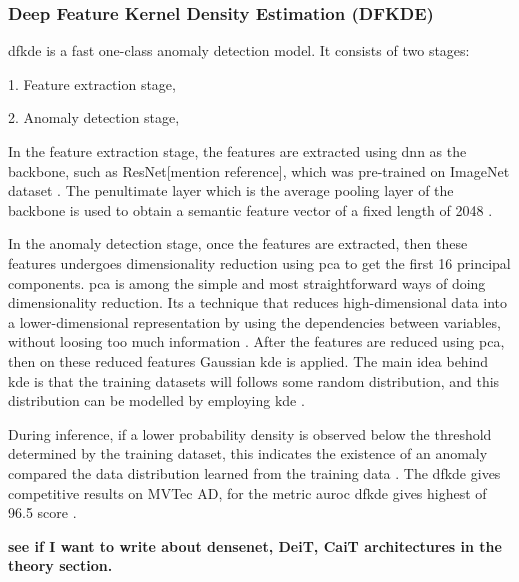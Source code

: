 \subsubsection{Deep Feature Kernel Density Estimation (DFKDE)}
\label{subsec:dfkde}

\gls{dfkde} is a fast one-class anomaly detection model. It consists of two stages:

1. Feature extraction stage,

2. Anomaly detection stage,

In the feature extraction stage, the features are extracted using \gls{dnn} as the backbone, such as ResNet[mention reference], which was pre-trained on ImageNet\cite{5206848} dataset \cite{10208786}. The penultimate layer which is the average pooling layer of the backbone is used to obtain a semantic feature vector of a fixed length of 2048 \cite{Anomalib2024}.

In the anomaly detection stage, once the features are extracted, then these features undergoes dimensionality reduction using \gls{pca}\cite{IBM2023} to get the first 16 principal components. \gls{pca} is among the simple and most straightforward ways of doing dimensionality reduction. Its a technique that reduces high-dimensional data into a lower-dimensional representation by using the dependencies between variables, without loosing too much information \cite{Shalizi2012}. After the features are reduced using \gls{pca}, then on these reduced features Gaussian \gls{kde} is applied. The main idea behind \gls{kde} is that the training datasets will follows some random distribution, and this distribution can be modelled by employing \gls{kde} \cite{10208786}.

During inference, if a lower probability density is observed below the threshold determined by the training dataset, this indicates the existence of an anomaly compared the data distribution learned from the training data \cite{10208786}. The \gls{dfkde} gives competitive results on MVTec AD\cite{8954181}, for the metric \gls{auroc} \gls{dfkde} gives highest of 96.5 score \cite{Anomalib2024}.

\textbf{see if I want to write about densenet, DeiT, CaiT architectures in the theory section.}

